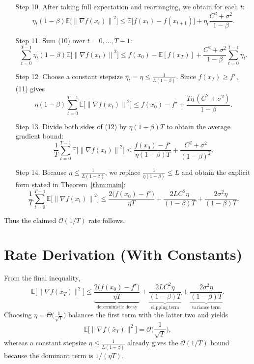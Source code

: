\documentclass{article}
\newcommand{\E}{\mathbb{E}}
\newcommand{\norm}[1]{\left\lVert #1 \right\rVert}
\begin{document}
\begin{enumerate}
\item[Step 10.] After taking full expectation and rearranging, we obtain for each $t$:
\[
\eta_t(1-\beta)\E\!\big[\norm{\nabla f(x_t)}^{2}\big]
\le \E\big[f(x_t)-f(x_{t+1})\big]
     +\eta_t\frac{C^{2}+ \sigma^{2}}{1-\beta}.
\tag{10}
\]

\item[Step 11.] Sum (10) over $t=0,\dots,T-1$:
\[
\sum_{t=0}^{T-1}\eta_t(1-\beta)\E\!\big[\norm{\nabla f(x_t)}^{2}\big]
\le f(x_0)-\E[f(x_T)]+\frac{C^{2}+\sigma^{2}}{1-\beta}\sum_{t=0}^{T-1}\eta_t .
\tag{11}
\]

\item[Step 12.] Choose a constant stepsize $\eta_t=\eta\le\frac{1}{L(1-\beta)}$.
Since $f(x_T)\ge f^\star$, (11) gives
\[
\eta(1-\beta)\sum_{t=0}^{T-1}\E\!\big[\norm{\nabla f(x_t)}^{2}\big]
\le f(x_0)-f^\star + \frac{T\eta\,(C^{2}+\sigma^{2})}{1-\beta}.
\tag{12}
\]

\item[Step 13.] Divide both sides of (12) by $\eta(1-\beta)T$ to obtain the average gradient bound:
\[
\frac{1}{T}\sum_{t=0}^{T-1}\E\!\big[\norm{\nabla f(x_t)}^{2}\big]
\le \frac{f(x_0)-f^\star}{\eta(1-\beta)T}
   +\frac{C^{2}+\sigma^{2}}{(1-\beta)^{2}} .
\tag{13}
\]

\item[Step 14.] Because $\eta\le\frac{1}{L(1-\beta)}$, we replace $\frac{1}{\eta(1-\beta)}\le L$ and obtain the explicit form stated in Theorem~\ref{thm:main}:
\[
\frac{1}{T}\sum_{t=0}^{T-1}\E\!\big[\norm{\nabla f(x_t)}^{2}\big]
\le
\frac{2\big(f(x_0)-f^\star\big)}{\eta T}
+\frac{2L C^{2}\eta}{(1-\beta)T}
+\frac{2\sigma^{2}\eta}{(1-\beta)T}.
\]
\end{enumerate}
Thus the claimed $\mathcal{O}(1/T)$ rate follows. \hfill\qedsymbol

\section*{Rate Derivation (With Constants)}
From the final inequality,
\[
\mathbb{E}\!\big[\|\nabla f(\bar x_T)\|^{2}\big]
\le
\underbrace{\frac{2\big(f(x_0)-f^\star\big)}{\eta T}}_{\text{deterministic decay}}
+
\underbrace{\frac{2L C^{2}\eta}{(1-\beta)T}}_{\text{clipping term}}
+
\underbrace{\frac{2\sigma^{2}\eta}{(1-\beta)T}}_{\text{variance term}} .
\]
Choosing $\eta = \Theta\!\big(\frac{1}{\sqrt{T}}\big)$ balances the first term with the latter two and yields
\[
\mathbb{E}\!\big[\|\nabla f(\bar x_T)\|^{2}\big]=\mathcal{O}\!\Big(\frac{1}{\sqrt{T}}\Big),
\]
whereas a constant stepsize $\eta\le\frac{1}{L(1-\beta)}$ already gives the $\mathcal{O}(1/T)$ bound because the dominant term is $1/(\eta T)$.
\end{document}
